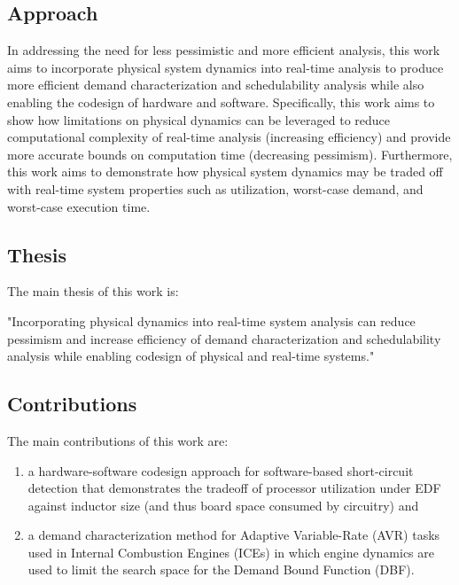 \subsection{Approach}
In addressing the need for less pessimistic and more efficient analysis, this work aims to incorporate physical system dynamics into real-time analysis to produce more efficient demand characterization and schedulability analysis while also enabling the codesign of hardware and software.
Specifically, this work aims to show how limitations on physical dynamics can be leveraged to reduce computational complexity of real-time analysis (increasing efficiency) and provide more accurate bounds on computation time (decreasing pessimism).
Furthermore, this work aims to demonstrate how physical system dynamics may be traded off with real-time system properties such as utilization, worst-case demand, and worst-case execution time.

\subsection{Thesis}

The main thesis of this work is:

"Incorporating physical dynamics into real-time system analysis can reduce pessimism and increase efficiency of demand characterization and schedulability analysis while enabling codesign of physical and real-time systems." 

\subsection{Contributions}

The main contributions of this work are:
\begin{enumerate}
    \item a hardware-software codesign approach for software-based short-circuit detection that demonstrates the tradeoff of processor utilization under EDF against inductor size (and thus board space consumed by circuitry) and
    \item a demand characterization method for Adaptive Variable-Rate (AVR) tasks used in Internal Combustion Engines (ICEs) in which engine dynamics are used to limit the search space for the Demand Bound Function (DBF).
\end{enumerate}

